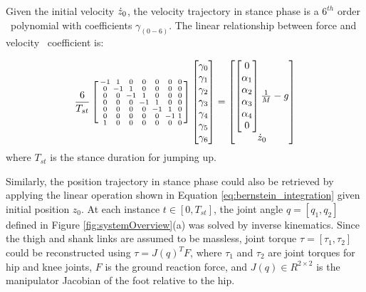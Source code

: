 Given the initial velocity ${\dot{z}}_0$, the velocity trajectory in stance phase is a $6^{th}$ order \Bezier\ polynomial with coefficients $\gamma_{(0-6)}$. The linear relationship between force and velocity \Bezier\ coefficient is:

\begin{equation}\label{eq:bernstein_integration}
\frac{6}{T_{st}}\left[
\begin{smallmatrix}
-1 & 1 & 0 & 0 & 0 & 0 & 0 \\
0 &-1 & 1 & 0 & 0 & 0 & 0 \\
0 & 0 &-1 & 1 & 0 & 0 & 0 \\
0 & 0 & 0 &-1 & 1 & 0 & 0 \\
0 & 0 & 0 & 0 &-1 & 1 & 0 \\
0 & 0 & 0 & 0 & 0 &-1 & 1 \\
1 & 0 & 0 & 0 & 0 & 0 & 0 \\
\end{smallmatrix}
\right]
\left[
\begin{matrix}
\gamma_0\\\gamma_1\\\gamma_2\\\gamma_3\\\gamma_4\\\gamma_5\\\gamma_6\\
\end{matrix}
\right]
=
\left[
\begin{matrix}
\left[
\begin{matrix}
0\\\alpha_1\\\alpha_2\\\alpha_3\\\alpha_4\\0\\
\end{matrix}
\right]\frac{1}{M}-g\\
{\dot{z}}_0\\
\end{matrix}
\right]
\end{equation}
where $T_{st}$ is the stance duration for jumping up.

Similarly, the position trajectory in stance phase could also be retrieved by applying the linear operation shown in Equation \ref{eq:bernstein_integration} given initial position $z_0$. At each instance  $t\in[0,T_{st} ]$, the joint angle $q=[q_1,q_2]$ defined in Figure \ref{fig:systemOverview}(a) was solved by inverse kinematics. Since the thigh and shank links are assumed to be massless, joint torque $\tau=[\tau_1,\tau_2]$ could be reconstructed using $\tau=J(q)^T F$, where $\tau_1$ and $\tau_2$ are joint torques for hip and knee joints, $F$ is the ground reaction force, and $J(q)\in R^{2\times 2} $ is the manipulator Jacobian of the foot relative to the hip.

